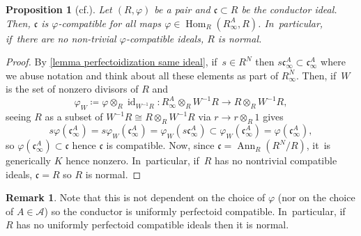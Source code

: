 \documentclass[11pt]{article}
\newcommand{\cf}{cf.\xspace}
\let\autoref\cref
\theoremstyle{plain}
\newtheorem{proposition}[theorem]{Proposition}
\theoremstyle{definition}
\newtheorem{remark}[theorem]{Remark}
\numberwithin{equation}{theorem}
\let\tensor\otimes
\newcommand{\fracc}{\mathfrak{c}}
\DeclareMathOperator{\Ann}{{Ann}}
\DeclareMathOperator{\Hom}{Hom}
\DeclareMathOperator{\id}{{id}}
\newcommand{\sA}{\mathcal{A}}
\renewcommand{\phi}{\varphi}
\newcommand{\rphi}{(R,\phi)}
\newcommand{\inv}{^{-1}}
\newcommand{\rafty}{R^A_\infty}
\newcommand{\cafty}{\fracc^A_\infty}
\begin{document}
\begin{proposition}[{\cf \cite[Exer.\,1.2.4\,(E)]{BrionKumarFrobeniusSplitting}}]\label{conductor ideal is compatible}
Let $\rphi$ be a pair and $\fracc\subset R$ be the conductor ideal. Then, $\fracc$ is $\phi$-compatible
for all maps $\phi\in \Hom_R(\rafty,R)$. In~particular, if~there are no non-trivial $\phi$-compatible ideals, $R$ is normal.
\end{proposition}

\begin{proof}
By \autoref{lemma perfectoidization same ideal}, if~$s\in R^N$ then $s\cafty\subset \cafty$ where we abuse notation and think about all these elements as part of $R^N_\infty$. Then, if~$W$ is the set of nonzero divisors of $R$ and
\[
\phi_W\coloneqq \phi\tensor_R \id_{W\inv R}\colon \rafty\tensor_R W\inv R\to R\tensor_R W\inv R,
\]
seeing $R$ as a subset of $W\inv R\cong R\tensor_R W\inv R$ via $r\to r\tensor_R 1$ gives
\[
s\phi(\cafty)=s \phi_W(\cafty)= \phi_W(s \cafty) \subset \phi_W(\cafty)= \phi(\cafty),
\]
so $\phi(\cafty)\subset \fracc$ hence $\fracc$ is compatible. Now, since $\fracc=\Ann_R(R^N/R)$, it~is generically $K$ hence nonzero. In~particular, if~$R$ has no nontrivial compatible ideals, $\fracc=R$ so $R$ is normal.
\end{proof}
\begin{remark}\label{conductor uniformly compatible}
Note that this is not dependent on the choice of $\phi$ (nor on the choice of $A\in \sA$) so the conductor is uniformly perfectoid compatible. In~particular, if~$R$ has no uniformly perfectoid compatible ideals then it is normal.
\end{remark}
\end{document}
